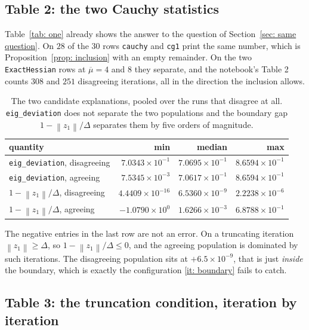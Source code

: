 \documentclass[11pt,a4paper]{article}
\providecommand{\norm}[1]{\left \lVert #1 \right \rVert}
\newcommand{\e}[1]{\times 10^{#1}}
\theoremstyle{remark}
\begin{document}
\subsection{Table 2: the two Cauchy statistics}\label{sec: table two}

Table~\ref{tab: one} already shows the answer to the question of
Section~\ref{sec: same question}. On $28$ of the $30$ rows \texttt{cauchy} and
\texttt{cg1} print the same number, which is Proposition~\ref{prop: inclusion}
with an empty remainder. On the two \texttt{ExactHessian} rows at
$\overline{\mu} = 4$ and $8$ they separate, and the notebook's Table 2 counts
$308$ and $251$ disagreeing iterations, all in the direction the inclusion
allows.

\begin{table}[H]
  \centering\small
  \caption{The two candidate explanations, pooled over the runs that disagree at
    all. \texttt{eig\_deviation} does not separate the two populations and the
    boundary gap $1 - \norm{z_1}/\Delta$ separates them by five orders of
    magnitude.}
  \label{tab: two}
  \begin{tabular}{lrrr}
    \toprule
    quantity & min & median & max \\
    \midrule
    \texttt{eig\_deviation}, disagreeing & $7.0343\e{-1}$ & $7.0695\e{-1}$ & $8.6594\e{-1}$ \\
    \texttt{eig\_deviation}, agreeing    & $7.5345\e{-3}$ & $7.0617\e{-1}$ & $8.6594\e{-1}$ \\
    \midrule
    $1 - \norm{z_1}/\Delta$, disagreeing & $4.4409\e{-16}$ & $6.5360\e{-9}$ & $2.2238\e{-6}$ \\
    $1 - \norm{z_1}/\Delta$, agreeing    & $-1.0790\e{0}$  & $1.6266\e{-3}$ & $6.8788\e{-1}$ \\
    \bottomrule
  \end{tabular}
\end{table}

The negative entries in the last row are not an error. On a truncating iteration
$\norm{z_1} \geq \Delta$, so $1 - \norm{z_1}/\Delta \leq 0$, and the agreeing
population is dominated by such iterations. The disagreeing population sits at
$+6.5\times10^{-9}$, that is just \emph{inside} the boundary, which is exactly
the configuration \ref{it: boundary} fails to catch.

\subsection{Table 3: the truncation condition, iteration by iteration}
\label{sec: table three}
\end{document}
